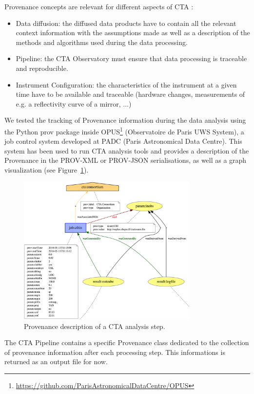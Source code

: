 Provenance concepts are relevant for different aspects of CTA :
\begin{itemize}
\item Data diffusion: the diffused data products have to contain all the relevant context information with the assumptions made as well as a description of the methods and algorithms used during the data processing.
\item Pipeline: the CTA Observatory must ensure that data processing is traceable and reproducible.
\item Instrument Configuration: the characteristics of the instrument at a given time have to be available and traceable (hardware changes, measurements of e.g. a reflectivity curve of a mirror, ...)
\end{itemize}

We tested the tracking of Provenance information during the data analysis using the Python prov package inside OPUS\footnote{\url{https://github.com/ParisAstronomicalDataCentre/OPUS}} (Observatoire de Paris UWS System), a job control system developed at PADC (Paris Astronomical Data Centre). This system has been used to run CTA analysis tools and provides a description of the Provenance in the PROV-XML or PROV-JSON serialisations, as well as a graph visualization (see Figure~\ref{fig:cta_prov}).

\begin{figure}
\centering
\includegraphics[width=0.8\textwidth]{CTA_prov.png}
\caption{Provenance description of a CTA analysis step.}
\label{fig:cta_prov}
\end{figure}

The CTA Pipeline contains a specific Provenance class dedicated to the collection of provenance information after each processing step. This informations is returned as an output file for now.

